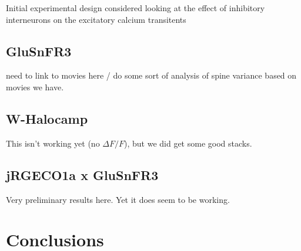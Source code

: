 \documentclass[a4paper,12pt]{article}
\begin{document}
Initial experimental design considered looking at the effect of inhibitory interneurons on the excitatory calcium transitents 

\subsection{GluSnFR3}

need to link to movies here / do some sort of analysis of spine variance based on movies we have. 

\subsection{W-Halocamp}

This isn't working yet (no $\Delta F / F$), but we did get some good stacks.  

\subsection{jRGECO1a x GluSnFR3}

Very preliminary results here.  Yet it does seem to be working. 

\section{Conclusions}
\end{document}
